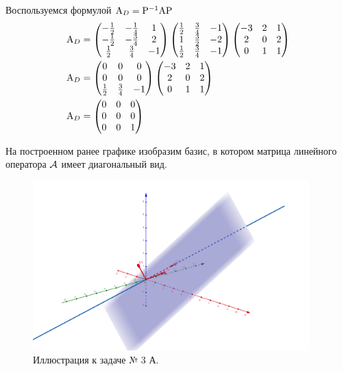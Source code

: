 Воспользуемся формулой \(\mathrm{A}_D = {\mathrm{P}}^{-1} \mathrm{A} \mathrm{P}\)
\begin{align*}
  \mathrm{A}_D
  &=
  \begin{pmatrix}
    -\frac{1}{2} & -\frac{1}{4} & 1 \\
    -\frac{1}{2} & -\frac{3}{4} & 2 \\
    \frac{1}{2} & \frac{3}{4} & -1
  \end{pmatrix}
  \begin{pmatrix}
    \frac{1}{2} & \frac{3}{4} & -1 \\
    1 & \frac{3}{2} & -2 \\
    \frac{1}{2} & \frac{3}{4} & -1
  \end{pmatrix}
  \begin{pmatrix}
      -3 & 2 & 1 \\
      2  & 0 & 2 \\
      0  & 1 & 1 \\
  \end{pmatrix} \\
  \mathrm{A}_D
  &=
  \begin{pmatrix}
    0 & 0 & 0\\
    0 & 0 & 0\\
    \frac{1}{2} & \frac{3}{4} & -1
  \end{pmatrix}
  \begin{pmatrix}
      -3 & 2 & 1 \\
      2  & 0 & 2 \\
      0  & 1 & 1 \\
  \end{pmatrix} \\
  \mathrm{A}_D
  &=
  \begin{pmatrix}
        0 & 0 & 0\\
        0 & 0 & 0\\
        0 & 0 & 1
  \end{pmatrix}
\end{align*}


На построенном ранее графике изобразим базис,
в котором матрица линейного оператора \(\mathcal{A}\) имеет диагональный вид.
\begin{figure}[!htbp]
  \centering
  \includegraphics[width=0.95\textwidth]{./img/03-a-2.png}
  \caption{Иллюстрация к задаче № 3 А. \protect\footnotemark}
\end{figure}

